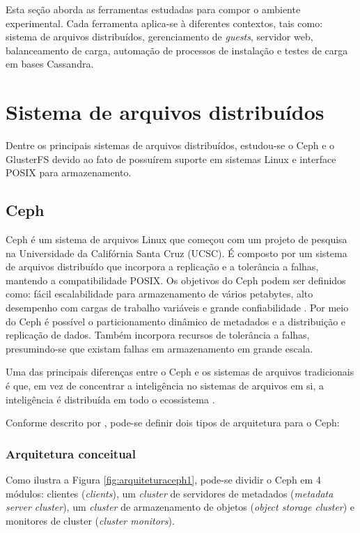 Esta seção aborda as ferramentas estudadas para compor o ambiente experimental. Cada ferramenta aplica-se à diferentes contextos, tais como: sistema de arquivos distribuídos, gerenciamento de \textit{guests}, servidor web, balanceamento de carga, automação de processos de instalação e testes de carga em bases Cassandra.
\section{Sistema de arquivos distribuídos}
Dentre os principais sistemas de arquivos distribuídos, estudou-se o Ceph e o GlusterFS devido ao fato de possuírem suporte em sistemas Linux e interface POSIX para armazenamento. 

\subsection{Ceph}
    Ceph \cite{Weil2007} é um sistema de arquivos Linux que começou com um projeto de pesquisa na Universidade da Califórnia Santa Cruz (UCSC). É composto por um sistema de arquivos distribuído que incorpora a replicação e a tolerância a falhas, mantendo a compatibilidade POSIX.
    Os objetivos do Ceph podem ser definidos como: fácil escalabilidade para armazenamento de vários petabytes, alto desempenho com cargas de trabalho variáveis e grande confiabilidade \cite{jones}.
    Por meio do Ceph é possível o particionamento dinâmico de metadados e a distribuição e replicação de dados. Também incorpora recursos de tolerância a falhas, presumindo-se que existam falhas em armazenamento em grande escala.
   
   \begin{citacao}
Uma das principais diferenças entre o Ceph e os sistemas de arquivos tradicionais é que, em vez de concentrar a inteligência no sistemas de arquivos em si, a inteligência é distribuída em todo o ecossistema \cite{jones}.
   \end{citacao}

Conforme descrito por \cite{jones}, pode-se definir dois tipos de arquitetura para o Ceph:
    
\subsubsection{Arquitetura conceitual}
\label{subsec:arqconceitual}

    Como ilustra a Figura \ref{fig:arquiteturaceph1}, pode-se dividir o Ceph em 4 módulos: clientes (\textit{clients}), um \textit{cluster} de servidores de metadados (\textit{metadata server cluster}), um \textit{cluster} de armazenamento de objetos (\textit{object storage cluster}) e monitores de cluster (\textit{cluster monitors}).
        
